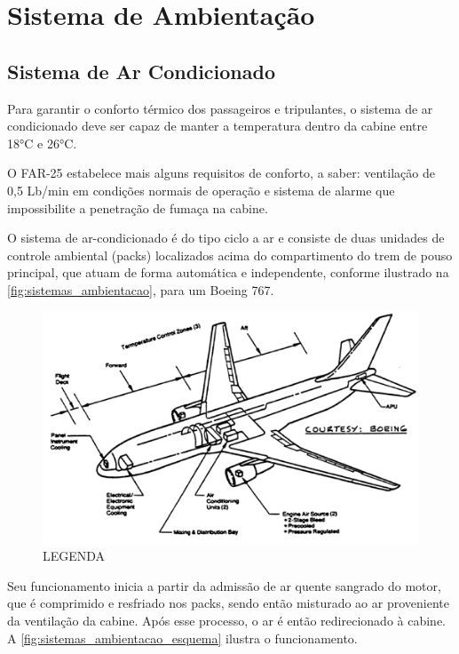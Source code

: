 \section{Sistema de Ambientação}

\subsection{Sistema de Ar Condicionado}

Para garantir o conforto térmico dos passageiros e tripulantes, o sistema de ar condicionado deve ser capaz de manter a temperatura dentro da cabine entre 18°C e 26°C.

O FAR-25 estabelece mais alguns requisitos de conforto, a saber: ventilação de 0,5 Lb/min em condições normais de operação e sistema de alarme que impossibilite a penetração de fumaça na cabine.

O sistema de ar-condicionado é do tipo ciclo a ar e consiste de duas unidades de controle ambiental (packs) localizados acima do compartimento do trem de pouso principal, que atuam de forma automática e independente, conforme ilustrado na \autoref{fig:sistemas_ambientacao}, para um Boeing 767.

\begin{figure}
\includegraphics[width=\textwidth]{images/parte3/sistemas_ambientacao.png}
\caption{LEGENDA}
\label{fig:sistemas_ambientacao}
\end{figure}

Seu funcionamento inicia a partir da admissão de ar quente sangrado do motor, que é comprimido e resfriado nos packs, sendo então misturado ao ar proveniente da ventilação da cabine.
Após esse processo, o ar é então redirecionado à cabine.
A \autoref{fig:sistemas_ambientacao_esquema} ilustra o funcionamento.

